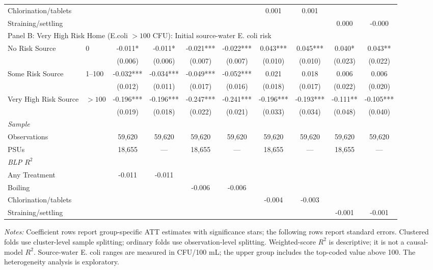 \begin{landscape}
\begin{table}[p]
\begin{adjustbox}{max width=\linewidth, center}
\begin{tabular}{llcccccccc}
\quad Chlorination/tablets &  &  &  &  &  & 0.001 & 0.001 &  &  \\
\quad Straining/settling &  &  &  &  &  &  &  & 0.000 & -0.000 \\
\midrule
\multicolumn{10}{l}{Panel B: Very High Risk Home (E.coli $>100$ CFU): Initial source-water E. coli risk} \\
No Risk Source & 0 & -0.011* & -0.011* & -0.021*** & -0.022*** & 0.043*** & 0.045*** & 0.040* & 0.043** \\
 &  & (0.006) & (0.006) & (0.007) & (0.007) & (0.010) & (0.010) & (0.023) & (0.022) \\
Some Risk Source & 1--100 & -0.032*** & -0.034*** & -0.049*** & -0.052*** & 0.021 & 0.018 & 0.006 & 0.006 \\
 &  & (0.012) & (0.011) & (0.017) & (0.016) & (0.018) & (0.017) & (0.022) & (0.020) \\
Very High Risk Source & $>100$ & -0.196*** & -0.196*** & -0.247*** & -0.241*** & -0.196*** & -0.193*** & -0.111** & -0.105*** \\
 &  & (0.019) & (0.018) & (0.022) & (0.021) & (0.033) & (0.034) & (0.048) & (0.040) \\
\multicolumn{10}{l}{\textit{Sample}} \\
\quad Observations &  & 59,620 & 59,620 & 59,620 & 59,620 & 59,620 & 59,620 & 59,620 & 59,620 \\
\quad PSUs &  & 18,655 & --- & 18,655 & --- & 18,655 & --- & 18,655 & --- \\
\multicolumn{10}{l}{\textit{BLP $R^{2}$}} \\
\quad Any Treatment &  & -0.011 & -0.011 &  &  &  &  &  &  \\
\quad Boiling &  &  &  & -0.006 & -0.006 &  &  &  &  \\
\quad Chlorination/tablets &  &  &  &  &  & -0.004 & -0.003 &  &  \\
\quad Straining/settling &  &  &  &  &  &  &  & -0.001 & -0.001 \\
\bottomrule
\end{tabular}
\end{adjustbox}
\par\vspace{3pt}
\begin{minipage}{\linewidth}\footnotesize \textit{Notes:} Coefficient rows report group-specific ATT estimates with significance stars; the following rows report standard errors. Clustered folds use cluster-level sample splitting; ordinary folds use observation-level splitting. Weighted-score $R^2$ is descriptive; it is not a causal-model $R^2$. Source-water E. coli ranges are measured in CFU/100 mL; the upper group includes the top-coded value above 100. The heterogeneity analysis is exploratory.\end{minipage}
\end{table}
\end{landscape}
